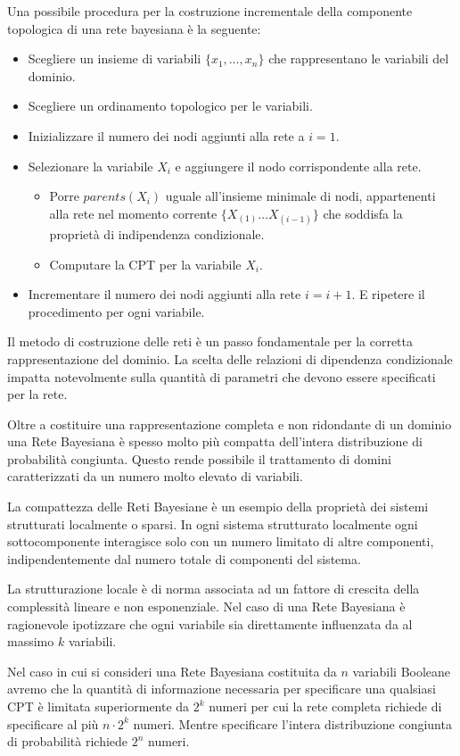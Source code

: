 Una possibile procedura per la costruzione incrementale della componente topologica
di una rete bayesiana è la seguente:
\begin{itemize}
    \item Scegliere un insieme di variabili $\{x_1, \dots, x_n\}$ che rappresentano
          le variabili del dominio.
    \item Scegliere un ordinamento topologico per le variabili.
    \item Inizializzare il numero dei nodi aggiunti alla rete a $i=1$.
    \item Selezionare la variabile $X_i$ e aggiungere il nodo corrispondente alla
          rete.
          \begin{itemize}
              \item Porre $parents(X_i)$ uguale all'insieme minimale di nodi,
                    appartenenti alla rete nel momento corrente $\{X_{(1)} \dots X_{(i-1)}\}$
                    che soddisfa la proprietà di indipendenza condizionale.
              \item Computare la CPT per la variabile $X_i$.
          \end{itemize}
    \item Incrementare il numero dei nodi aggiunti alla rete $i=i+1$. E ripetere il
          procedimento per ogni variabile.
\end{itemize}
Il metodo di costruzione delle reti è un passo fondamentale per la corretta
rappresentazione del dominio. La scelta delle relazioni di dipendenza condizionale
impatta notevolmente sulla quantità di parametri che devono essere specificati
per la rete.

Oltre a costituire una rappresentazione completa e non ridondante di un dominio
una Rete Bayesiana è spesso molto più compatta dell'intera distribuzione di
probabilità congiunta. Questo rende possibile il trattamento di domini
caratterizzati da un numero molto elevato di variabili.

La compattezza delle Reti Bayesiane è un esempio della proprietà dei sistemi
strutturati localmente o sparsi. In ogni sistema strutturato localmente ogni
sottocomponente interagisce solo con un numero limitato di altre componenti,
indipendentemente dal numero totale di componenti del sistema.

La strutturazione locale è di norma associata ad un fattore di crescita della
complessità lineare e non esponenziale. Nel caso di una Rete Bayesiana è ragionevole
ipotizzare che ogni variabile sia direttamente influenzata da al massimo $k$
variabili.

Nel caso in cui si consideri una Rete Bayesiana costituita da $n$ variabili
Booleane avremo che la quantità di informazione necessaria per specificare una
qualsiasi CPT è limitata superiormente da $2^k$ numeri per cui la rete completa
richiede di specificare al più $n \cdot 2^k$ numeri. Mentre specificare l'intera
distribuzione congiunta di probabilità richiede $2^n$ numeri.